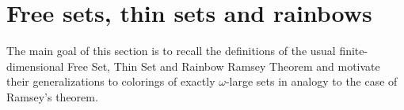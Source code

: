 \documentclass[10pt,a4paper]{article}
\def\PP{\mathbb{P}}
\newcommand{\Psf}{\mathsf{P}}
\newcommand{\Qsf}{\mathsf{Q}}
\def\Q{\mathcal{Q}}
\newcommand{\RCA}[0]{\mathsf{RCA}}
\newcommand{\W}{\mathrm{W}}
\newcommand{\sW}{\mathrm{sW}}
\numberwithin{theorem}{section}
\begin{document}


\section{Free sets, thin sets and rainbows}\label{sec:fs_ts_rainbow}

The main goal of this section is to recall the definitions of the usual finite-dimensional Free Set, Thin Set and Rainbow Ramsey Theorem and motivate their generalizations to colorings of exactly $\omega$-large sets in analogy to the case of Ramsey's theorem. %
\end{document}
